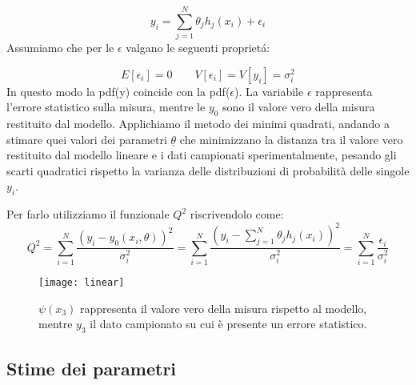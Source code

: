 \begin{equation}
	y_i = \sum_{j = 1}^N \theta_{j}h_{j}(x_i) + \epsilon_i
\end{equation}
Assumiamo che per le $\epsilon$ valgano le seguenti propriet\'{a}:

\begin{equation*}
	E[\epsilon_i] = 0 \quad \quad V[\epsilon_i]= V[y_i] = \sigma_i^2
\end{equation*}
In questo modo la pdf(y) coincide con la pdf($\epsilon$). La variabile $\epsilon$ rappresenta l'errore statistico sulla misura, mentre le $y_0$ sono il valore vero della misura restituito dal modello.
\newline
Applichiamo il metodo dei minimi quadrati, andando a stimare quei valori dei parametri $\underline{\theta}$ che minimizzano la distanza tra il valore vero restituito dal modello lineare e i dati campionati sperimentalmente, pesando gli scarti quadratici rispetto la varianza delle distribuzioni di probabilit\`{a} delle singole $y_i$.

\noindent Per farlo utilizziamo il funzionale $Q^2$ riscrivendolo come:
\begin{equation}
	Q^2 = \sum_{i=1}^N \dfrac{(y_i - y_0(x_i, \theta))^2}{\sigma_i^2} = \sum_{i=1}^N \dfrac{(y_i - \sum_{j=1}^N \theta_j h_j(x_i))^2}{\sigma_i^2} = \sum_{i=1}^N \dfrac{\epsilon_i}{\sigma^2_i} 
\end{equation}
\begin{figure}[ht]
\texttt{[image: linear]}	
\centering
\vspace{0.2in}
\caption{$\psi(x_3)$ rappresenta il valore vero della misura rispetto al modello, mentre $y_3$ il dato campionato su cui \`{e} presente un errore statistico.}
\end{figure}
\subsection{Stime dei parametri}

